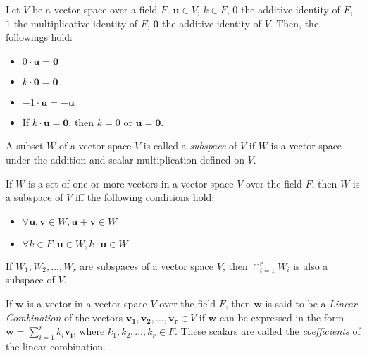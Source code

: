 \documentclass{report}
\begin{document}
		\begin{thm}
			Let $V$ be a vector space over a field $F$. $\bm{u} \in V$, $k \in F$, $0$ the additive identity of $F$, $1$ the multiplicative identity of $F$, $\bm{0}$ the additive identity of $V$. Then, the followings hold:
			\begin{itemize}
				\item $0 \cdot \bm{u} = \bm{0}$
				\item $k \cdot \bm{0} = \bm{0}$
				\item $-1 \cdot \bm{u} = -\bm{u}$
				\item If $k \cdot \bm{u} = \bm{0}$, then $k=0$ or $\bm{u}=\bm{0}$.
			\end{itemize}
		\end{thm}
		
		\begin{defn}
			A subset $W$ of a vector space $V$ is called a \emph{subspace} of $V$ if $W$ is a vector space under the addition and scalar multiplication defined on $V$.
		\end{defn}

		\begin{thm}
			If $W$ is a set of one or more vectors in a vector space $V$ over the field $F$, then $W$ is a subspace of $V$ iff the following conditions hold:
			\begin{itemize}
				\item $\forall \bm{u}, \bm{v} \in W, \bm{u}+\bm{v} \in W$
				\item $\forall k \in F, \bm{u} \in W, k \cdot \bm{u} \in W$
			\end{itemize}
		\end{thm}
	
		\begin{thm}
			If $W_1, W_2, \dots , W_r$ are subspaces of a vector space $V$, then $\cap_{i=1}^{r}W_i$ is also a subspace of $V$.
		\end{thm}
	
		\begin{defn} \label{def_linear_combination_vector}
			If $\bm{w}$ is a vector in a vector space $V$ over the field $F$, then $\bm{w}$ is said to be a \emph{Linear Combination} of the vectors $\bm{v_1}, \bm{v_2}, \dots, \bm{v_r} \in V$ if $\bm{w}$ can be expressed in the form $\bm{w}=\sum_{i=1}^{r}k_i\bm{v_i}$, where $k_1, k_2, \dots, k_r \in F$. These scalars are called the \emph{coefficients} of the linear combination.
		\end{defn}
	
\end{document}
